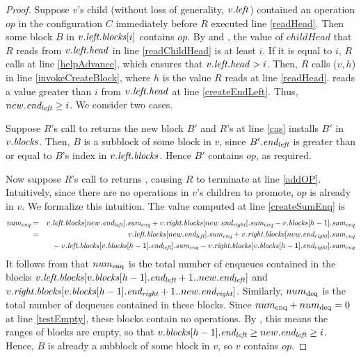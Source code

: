 \begin{proof}
Suppose $v$'s child (without loss of generality, $v.\mbox{\textit{left}}$) contained an operation $op$ 
in the configuration $C$ immediately before $R$ executed line \ref{readHead}.
Then some block $B$ in $v.\mbox{\textit{left.blocks}}[i]$ contains $op$.
By  and , the value of $childHead$ that $R$ reads from
$v.\mbox{\textit{left.head}}$ in line \ref{readChildHead} is at least $i$.
If it is equal to $i$, $R$ calls  at line \ref{helpAdvance}, which ensures that 
$v.\mbox{\textit{left.head}} > i$.
Then, $R$ calls ($v,h$) in line \ref{invokeCreateBlock}, where $h$ is the value $R$ reads at line \ref{readHead}.
 reads a value greater than $i$ from $v.\mbox{\textit{left.head}}$ at line \ref{createEndLeft}.
Thus, $new.\mbox{\textit{end\textsubscript{left}}} \geq i$.  We consider two cases.

Suppose $R$'s call to  returns the new block $B'$ and $R$'s  at line \ref{cas} 
installs $B'$ in $v.\mbox{\textit{blocks}}$.
Then, $B$ is a subblock of some block in $v$, since  $B'.\mbox{\textit{end\textsubscript{left}}}$ is greater than or equal to $B$'s index
in $v.\mbox{\textit{left.blocks}}$.
Hence $B'$ contains $op$, as required.

Now suppose $R$'s call to  returns \nl, causing $R$ to terminate at line \ref{addOP}.
Intuitively, since there are no operations in $v$'s children to promote, $op$ is already in $v$.
We formalize this intuition.
The value computed at line \ref{createSumEnq} is
\begin{eqnarray*}
\mbox{\textit{num\textsubscript{enq}}} 
&=& v.\mbox{\textit{left.blocks}}[new.\mbox{\textit{end\textsubscript{left}}}].\mbox{\textit{sum\textsubscript{enq}}} + v.\mbox{\textit{right.blocks}}[new.\mbox{\textit{end\textsubscript{right}}}].\mbox{\textit{sum\textsubscript{enq}}} - v.\mbox{\textit{blocks}}[h-1].\mbox{\textit{sum\textsubscript{enq}}} \\
&=& v.\mbox{\textit{left.blocks}}[new.\mbox{\textit{end\textsubscript{left}}}].\mbox{\textit{sum\textsubscript{enq}}} + v.\mbox{\textit{right.blocks}}[new.\mbox{\textit{end\textsubscript{right}}}].\mbox{\textit{sum\textsubscript{enq}}} \\
&&\mbox{ }- v.\mbox{\textit{left.blocks}}[v.\mbox{\textit{blocks}}[h-1].\mbox{\textit{end\textsubscript{left}}}].\mbox{\textit{sum\textsubscript{enq}}} - v.\mbox{\textit{right.blocks}}[v.\mbox{\textit{blocks}}[h-1].\mbox{\textit{end\textsubscript{right}}}].\mbox{\textit{sum\textsubscript{enq}}}
\end{eqnarray*}
It follows from  that $num\textsubscript{enq}$ is the total number of enqueues contained in the blocks
$v.\mbox{\textit{left.blocks}}[v.\mbox{\textit{blocks}}[h-1].\mbox{\textit{end\textsubscript{left}}}+1..new.\mbox{\textit{end\textsubscript{left}}}]$ and
$v.\mbox{\textit{right.blocks}}[v.\mbox{\textit{blocks}}[h-1].\mbox{\textit{end\textsubscript{right}}}+1..new.\mbox{\textit{end\textsubscript{right}}}]$.
Similarly, $num\textsubscript{deq}$ is the total number of dequeues contained in these blocks.
Since $num\textsubscript{enq}+num\textsubscript{deq}=0$ at line \ref{testEmpty},
these blocks contain no operations.
By , this means the ranges of blocks are empty, so that $v.\mbox{\textit{blocks}}[h-1].\mbox{\textit{end\textsubscript{left}}} \geq new.\mbox{\textit{end\textsubscript{left}}} \geq i$.
Hence, $B$ is already a subblock of some block in $v$, so $v$ contains $op$.
\end{proof}

